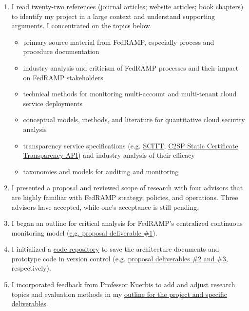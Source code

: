 \documentclass{jdf}
\begin{document}
\begin{enumerate}
    \item I read twenty-two references (journal articles; website articles; book chapters) to identify my project in a large context and understand supporting arguments. I concentrated on the topics below.
        \begin{itemize}
            \item primary source material from FedRAMP, especially process and procedure documentation
            \item industry analysis and criticism of FedRAMP processes and their impact on FedRAMP stakeholders
            \item technical methods for monitoring multi-account and multi-tenant cloud service deployments
            \item conceptual models, methods, and literature for quantitative cloud security analysis
            \item transparency service specifications (e.g. \hyperlink{https://datatracker.ietf.org/doc/draft-ietf-scitt-architecture/}{SCITT}; \hyperlink{https://c2sp.org/static-ct-api}{C2SP Static Certificate Transparency API}) and industry analysis of their efficacy
            \item taxonomies and models for auditing and monitoring
        \end{itemize}
    \item I presented a proposal and reviewed scope of research with four advisors that are highly familiar with FedRAMP strategy, policies, and operations. Three advisors have accepted, while one's acceptance is still pending.
    \item I began an outline for critical analysis for FedRAMP's centralized continuous monitoring model (\hyperlink{https://github.com/aj-stein/practicum_proposal/blob/main/paper.pdf}{e.g. proposal deliverable \#1}).
    \item I initialized a \hyperlink{https://github.com/aj-stein/conmotion.git}{code repository} to save the architecture documents and prototype code in version control (e.g. \hyperlink{https://github.com/aj-stein/practicum_proposal/blob/main/paper.pdf}{proposal deliverables \#2 and \#3}, respectively).
    \item I incorporated feedback from Professor Kuerbis to add and adjust research topics and evaluation methods in my \hyperlink{https://github.com/aj-stein/practicum/blob/main/notes.pdf}{outline for the project and specific deliverables}.
\end{enumerate}
\end{document}
